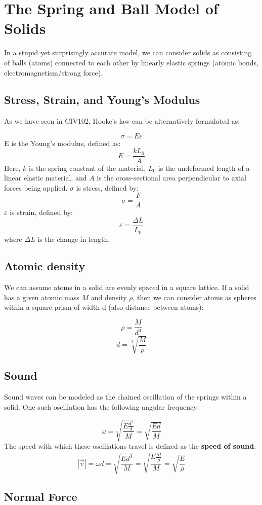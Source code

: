 \documentclass{article}
\begin{document}
\pagebreak
\section{The Spring and Ball Model of Solids}
In a stupid yet surprisingly accurate model, we can consider solids as consisting of balls (atoms) connected to each other by linearly elastic springs (atomic bonds, electromagnetism/strong force). 

\subsection{Stress, Strain, and Young's Modulus}

As we have seen in CIV102, Hooke's law can be alternatively formulated as:

$$\sigma=E \varepsilon$$
E is the Young's modulus, defined as:
$$E=\frac{kL_0}{A}$$
Here, $k$ is the spring constant of the material, $L_0$ is the undeformed length of a linear elastic material, and $A$ is the cross-sectional area perpendicular to axial forces being applied.
$\sigma$ is stress, defined by:
$$\sigma=\frac{F}{A}$$
$\varepsilon$ is strain, defined by:
$$\varepsilon=\frac{\Delta L}{L_0}$$
where $\Delta L$ is the change in length.

\subsection{Atomic density}
We can assume atoms in a solid are evenly spaced in a square lattice. If a solid has a given atomic mass $M$ and density $\rho$, then we can consider atoms as spheres within a square prism of width d (also distance between atoms):

$$\rho=\frac{M}{d^3}$$
$$d =\sqrt[3]{\frac{M}{\rho}}$$
\subsection{Sound}
Sound waves can be modeled as the chained oscillation of the springs within a solid. One such oscillation has the following angular frequency:

$$ \omega=\sqrt{\frac{E\frac{d^2}{d}}{M}}= \sqrt{\frac{Ed}{M}}$$
The speed with which these oscillations travel is defined as the \textbf{speed of sound}:
$$|\vec{v}|=\omega d=\sqrt{\frac{Ed^3}{M}}=\sqrt{\frac{E\frac{M}{\rho}}{M}}=\sqrt{\frac{E}{\rho}} $$

\subsection{Normal Force}
\end{document}
